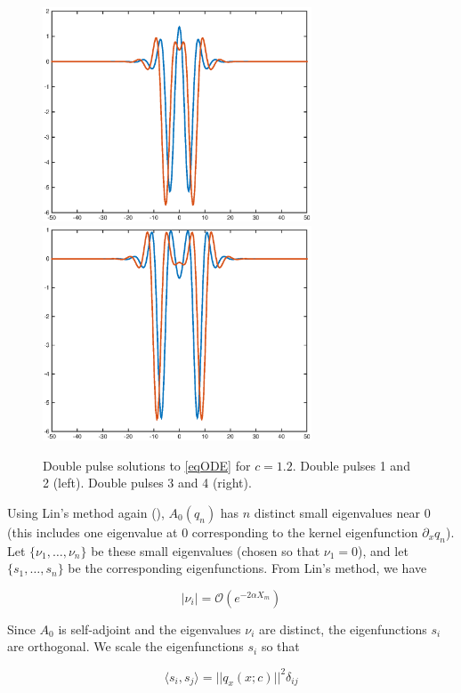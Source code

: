 \documentclass[12pt]{article}
\begin{document}
\begin{figure}[H]
\centering
\includegraphics[width=8cm]{double12_12.eps}
\includegraphics[width=8cm]{double12_34.eps}
\caption{Double pulse solutions to \eqref{eqODE} for $c = 1.2$. Double pulses 1 and 2 (left). Double pulses 3 and 4 (right).}
\end{figure}

Using Lin's method again (\cite{Sandstede1998}), $A_0(q_n)$ has $n$ distinct small eigenvalues near 0 (this includes one eigenvalue at 0 corresponding to the kernel eigenfunction $\partial_x q_n$). Let $\{\nu_1, \dots, \nu_n\}$ be these small eigenvalues (chosen so that $\nu_1 = 0$), and let $\{s_1, \dots, s_n \}$ be the corresponding eigenfunctions. From Lin's method, we have

\begin{equation}
|\nu_i| = \mathcal{O}(e^{-2 \alpha X_m})
\end{equation}

Since $A_0$ is self-adjoint and the eigenvalues $\nu_i$ are distinct, the eigenfunctions $s_i$ are orthogonal. We scale the eigenfunctions $s_i$ so that

\begin{equation}\label{orthonormaleigs}
\langle s_i, s_j \rangle = ||q_x(x; c)||^2 \delta_{ij}
\end{equation}
\end{document}
